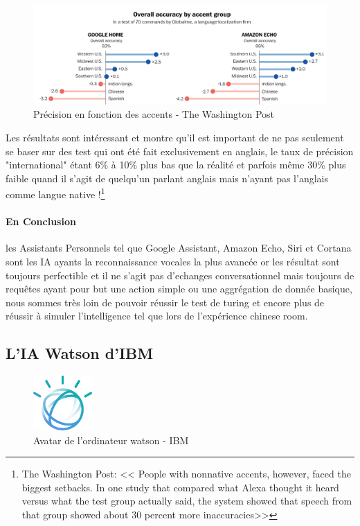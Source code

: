 \begin{figure}[H]
    \centering
    \includegraphics[width=1.0\textwidth]{Images/accuracyperaccent}
    \caption{Précision en fonction des accents - The Washington Post}
    \label{fig:accentaccuracy}
\end{figure}

Les résultats sont intéressant et montre qu'il est important de ne pas seulement se baser sur des
test qui ont été fait exclusivement en anglais, le taux de précision "international" étant
6\% à 10\% plus bas que la réalité et parfois même 30\% plus faible quand il s'agit de quelqu'un
parlant anglais mais n'ayant pas l'anglais comme langue native !\footnote{The Washington Post:
<< People with nonnative accents, however, faced the biggest setbacks. In one study that compared
what Alexa thought it heard versus what the test group actually said, the system showed that speech
from that group showed about 30 percent more inaccuracies>>} \newline

\paragraph{En Conclusion} les Assistants Personnels tel que Google Assistant, Amazon Echo, Siri et
Cortana sont les IA ayants la reconnaissance vocales la plus avancée or les résultat sont toujours
perfectible et il ne s'agit pas d'echanges conversationnel mais toujours de requêtes
ayant pour but une action simple ou une aggrégation de donnée basique, nous sommes très loin
de pouvoir réussir le test de turing et encore plus de réussir à simuler l'intelligence tel que
lors de l'expérience chinese room.


\subsection*{L'IA Watson d'IBM}
\begin{figure}[H]
    \centering
    \includegraphics[width=0.2\textwidth]{Images/watsonlogo}
    \caption{Avatar de l'ordinateur watson - IBM}
    \label{fig:watsonlogo}
\end{figure}

